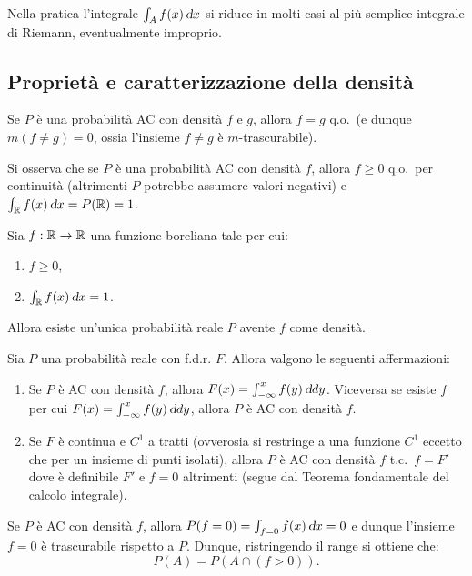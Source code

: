 \begin{multicols*}{2}
\begin{remark}
    Nella pratica l'integrale $\int_A f(x) \dx$ si riduce in molti casi
    al più semplice integrale di Riemann, eventualmente improprio.
\end{remark}

\subsection{Proprietà e caratterizzazione della densità}

\begin{proposition}
    Se $P$ è una probabilità AC con densità $f$ e $g$, allora
    $f = g$ q.o.~(e dunque $m(f \neq g) = 0$, ossia l'insieme
    $f \neq g$ è $m$-trascurabile).
\end{proposition}

\begin{remark}
    Si osserva che se $P$ è una probabilità AC con densità
    $f$, allora $f \geq 0$ q.o.~per continuità (altrimenti $P$ potrebbe
    assumere valori negativi) e $\int_\RR f(x) \dx = P(\RR) = 1$.
\end{remark}

\begin{proposition}
    Sia $f : \mathbb{R} \to \mathbb{R}$ una funzione boreliana tale per cui:
    \begin{enumerate}[(i.)]
        \item $f \geq 0$,
        \item $\int_\RR f(x) \dx = 1$.
    \end{enumerate}
    Allora esiste un'unica probabilità reale $P$ avente $f$ come densità.
\end{proposition}

\begin{proposition}
    Sia $P$ una probabilità reale con f.d.r. $F$. Allora valgono le seguenti affermazioni:
    \begin{enumerate}[(i.)]
        \item Se $P$ è AC con densità $f$, allora $F(x) = \int_{-\infty}^x f(y) \dy$. Viceversa
        se esiste $f$ per cui $F(x) = \int_{-\infty}^x f(y) \dy$, allora $P$ è AC con densità
        $f$.
        \item Se $F$ è continua e $C^1$ a tratti (ovverosia si restringe a una funzione $C^1$ eccetto che per un insieme di punti isolati),
        allora $P$ è AC con densità $f$ t.c.~$f = F'$ dove è definibile $F'$ e $f = 0$ altrimenti (segue dal Teorema fondamentale del calcolo integrale).
    \end{enumerate}
\end{proposition}

\begin{remark}
    Se $P$ è AC con densità $f$, allora $P(f = 0) = \int_{f = 0} f(x) \dx = 0$ e dunque
    l'insieme $f = 0$ è trascurabile rispetto a $P$. Dunque, ristringendo il range si
    ottiene che:
    \[
        P(A) = P(A \cap (f > 0)).
    \]
\end{remark}

\end{multicols*}